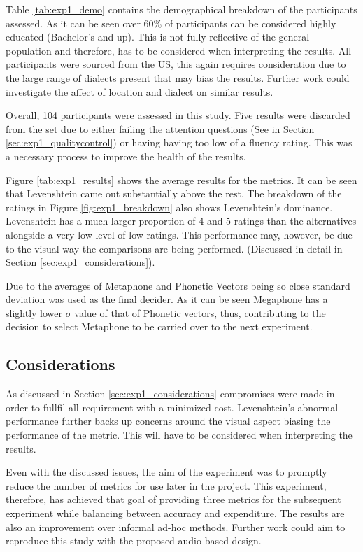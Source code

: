 Table \ref{tab:exp1_demo} contains the demographical breakdown of the participants assessed. As it can be seen over 60\% of participants can be considered highly educated (Bachelor’s and up). This is not fully reflective of the general population and therefore, has to be considered when interpreting the results. All participants were sourced from the US, this again requires consideration due to the large range of dialects present that may bias the results. Further work could investigate the affect of location and dialect on similar results. 

Overall, 104 participants were assessed in this study. Five results were discarded from the set due to either failing the attention questions (See in Section \ref{sec:exp1_qualitycontrol}) or having having too low of a fluency rating. This was a necessary process to improve the health of the results. 

Figure \ref{tab:exp1_results} shows the average results for the metrics. It can be seen that Levenshtein came out substantially above the rest. The breakdown of the ratings in Figure \ref{fig:exp1_breakdown} also shows Levenshtein's dominance. Levenshtein has a much larger proportion of 4 and 5 ratings than the alternatives alongside a very low level of low ratings. This performance may, however, be due to the visual way the comparisons are being performed. (Discussed in detail in Section \ref{sec:exp1_considerations}). 

Due to the averages of Metaphone and Phonetic Vectors being so close standard deviation was used as the final decider. As it can be seen Megaphone has a slightly lower $\sigma$ value of that of Phonetic vectors, thus, contributing to the decision to select Metaphone to be carried over to the next experiment.

\subsection*{Considerations}
As discussed in Section \ref{sec:exp1_considerations} compromises were made in order to fullfil all requirement with a minimized cost. Levenshtein's abnormal performance further backs up concerns around the visual aspect biasing the performance of the metric. This will have to be considered when interpreting the results. 

Even with the discussed issues, the aim of the experiment was to promptly reduce the number of metrics for use later in the project. This experiment, therefore, has achieved that goal of providing three metrics for the subsequent experiment while balancing between accuracy and expenditure. The results are also an improvement over informal ad-hoc methods. Further work could aim to reproduce this study with the proposed audio based design.

